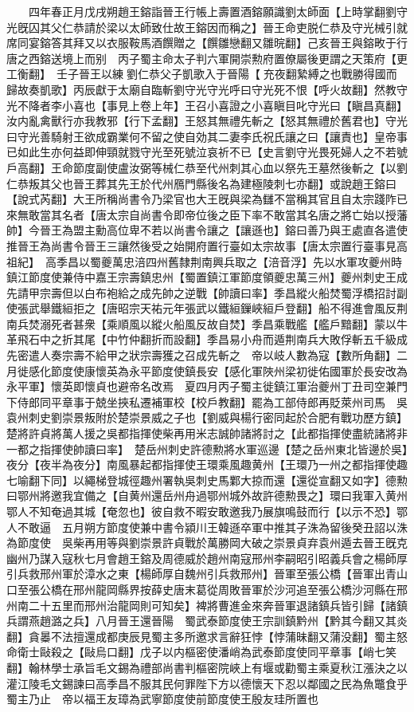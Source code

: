 　　四年春正月戊戌朔趙王鎔詣晉王行帳上壽置酒鎔願識劉太師面【上時掌翻劉守光旣囚其父仁恭請於梁以太師致仕故王鎔因而稱之】晉王命吏脱仁恭及守光械引就席同宴鎔答其拜又以衣服鞍馬酒饌贈之【饌雛戀翻又雛晥翻】己亥晉王與鎔畋于行唐之西鎔送境上而别　丙子蜀主命太子判六軍開崇勲府置僚屬後更謂之天策府【更工衡翻】　壬子晉王以練劉仁恭父子凱歌入于晉陽【充夜翻縶縛之也戰勝得國而歸故奏凱歌】丙辰獻于太廟自臨斬劉守光守光呼曰守光死不恨【呼火故翻】然教守光不降者李小喜也【事見上卷上年】王召小喜證之小喜瞋目叱守光曰【瞋昌真翻】汝内亂禽獸行亦我教邪【行下孟翻】王怒其無禮先斬之【怒其無禮於舊君也】守光曰守光善騎射王欲成霸業何不留之使自効其二妻李氏祝氏讓之曰【讓責也】皇帝事已如此生亦何益即伸頸就戮守光至死號泣哀祈不已【史言劉守光畏死婦人之不若號戶高翻】王命節度副使盧汝弼等械仁恭至代州刺其心血以祭先王墓然後斬之【以劉仁恭叛其父也晉王葬其先王於代州鴈門縣後名為建極陵刺七亦翻】或說趙王鎔曰【說式芮翻】大王所稱尚書令乃梁官也大王旣與梁為讎不當稱其官且自太宗踐阼已來無敢當其名者【唐太宗自尚書令即帝位後之臣下率不敢當其名唐之將亡始以授藩帥】今晉王為盟主勳高位卑不若以尚書令讓之【讓遜也】鎔曰善乃與王處直各遣使推晉王為尚書令晉王三讓然後受之始開府置行臺如太宗故事【唐太宗置行臺事見高祖紀】　高季昌以蜀夔萬忠涪四州舊隸荆南興兵取之【涪音浮】先以水軍攻夔州時鎮江節度使兼侍中嘉王宗壽鎮忠州【蜀置鎮江軍節度領夔忠萬三州】夔州刺史王成先請甲宗壽但以白布袍給之成先帥之逆戰【帥讀曰率】季昌縱火船焚蜀浮橋招討副使張武舉鐵絙拒之【唐昭宗天祐元年張武以鐵絙鏁峽絙戶登翻】船不得進會風反荆南兵焚溺死者甚衆【乘順風以縱火船風反故自焚】季昌乘戰艦【艦戶黯翻】蒙以牛革飛石中之折其尾【中竹仲翻折而設翻】季昌易小舟而遁荆南兵大敗俘斬五千級成先密遣人奏宗壽不給甲之狀宗壽獲之召成先斬之　帝以岐人數為寇【數所角翻】二月徙感化節度使康懷英為永平節度使鎮長安【感化軍陜州梁初徙佑國軍於長安改為永平軍】懷英即懷貞也避帝名改焉　夏四月丙子蜀主徙鎮江軍治夔州丁丑司空兼門下侍郎同平章事于兢坐挾私遷補軍校【校戶教翻】罷為工部侍郎再貶萊州司馬　吳袁州刺史劉崇景叛附於楚崇景威之子也【劉威與楊行密同起於合肥有戰功歷方鎮】楚將許貞將萬人援之吳都指揮使柴再用米志誠帥諸將討之【此都指揮使盡統諸將非一都之指揮使帥讀曰率】　楚岳州刺史許德勲將水軍巡邊【楚之岳州東北皆邊於吳】夜分【夜半為夜分】南風暴起都指揮使王環乘風趣黄州【王環乃一州之都指揮使趣七喻翻下同】以繩梯登城徑趣州署執吳刺史馬鄴大掠而還【還從宣翻又如字】德勲曰鄂州將邀我宜備之【自黄州還岳州舟過鄂州城外故許德勲畏之】環曰我軍入黄州鄂人不知奄過其城【奄忽也】彼自救不暇安敢邀我乃展旗鳴鼓而行【以示不恐】鄂人不敢逼　五月朔方節度使兼中書令潁川王韓遜卒軍中推其子洙為留後癸丑詔以洙為節度使　吳柴再用等與劉崇景許貞戰於萬勝岡大破之崇景貞弃袁州遁去晉王旣克幽州乃謀入寇秋七月會趙王鎔及周德威於趙州南寇邢州李嗣昭引昭義兵會之楊師厚引兵救邢州軍於漳水之東【楊師厚自魏州引兵救邢州】晉軍至張公橋【晉軍出青山口至張公橋在邢州龍岡縣界按薛史唐末葛從周敗晉軍於沙河追至張公橋沙河縣在邢州南二十五里而邢州治龍岡則可知矣】裨將曹進金來奔晉軍退諸鎮兵皆引歸【諸鎮兵謂燕趙潞之兵】八月晉王還晉陽　蜀武泰節度使王宗訓鎮黔州【黔其今翻又其炎翻】貪㬥不法擅還成都庚辰見蜀主多所邀求言辭狂悖【悖蒲昧翻又蒲没翻】蜀主怒命衛士敺殺之【敺烏口翻】戊子以内樞密使潘峭為武泰節度使同平章事【峭七笑翻】翰林學士承旨毛文錫為禮部尚書判樞密院峽上有堰或勸蜀主乘夏秋江漲決之以灌江陵毛文錫諫曰高季昌不服其民何罪陛下方以德懷天下忍以鄰國之民為魚鼈食乎蜀主乃止　帝以福王友璋為武寧節度使前節度使王殷友珪所置也